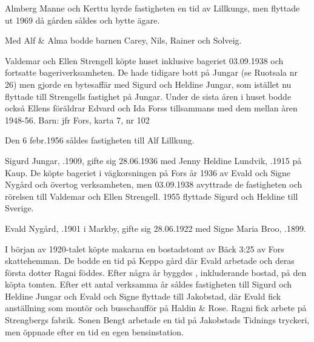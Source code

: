 Almberg Manne och Kerttu hyrde fastigheten en tid av Lillkungs, men flyttade ut 1969 då gården såldes och bytte ägare.

Med Alf \& Alma bodde barnen Carey, Nils, Rainer och Solveig.



Valdemar och Ellen Strengell köpte huset inklusive bageriet 03.09.1938 och fortsatte bageriverksamheten. De hade tidigare bott på Jungar (se Ruotsala nr 26) men gjorde en bytesaffär med Sigurd och Heldine Jungar, som istället nu flyttade till Strengells fastighet på Jungar. Under de sista åren i huset bodde också Ellens föräldrar Edvard och Ida Forss tillsammans med dem mellan åren 1948-56.
Barn: jfr Fors, karta 7, nr 102

Den 6 febr.1956 såldes fastigheten till Alf Lillkung.



Sigurd Jungar, .1909, gifte sig 28.06.1936 med Jenny Heldine Lundvik, .1915 på Kaup. De köpte bageriet i vägkorsningen på Fors år 1936 av Evald och Signe Nygård och övertog verksamheten, men 03.09.1938 avyttrade de fastigheten och rörelsen till Valdemar och Ellen Strengell. 1955 flyttade Sigurd och Heldine till Sverige.

\begin{jhchildren}
  \item {}
  \item {}
  \item {}
\end{jhchildren}



Evald Nygård, .1901 i Markby, gifte sig 28.06.1922 med Signe Maria Broo, .1899.

I början av 1920-talet köpte makarna en bostadstomt av Bäck 3:25 av Fors skattehemman. De bodde en tid på Keppo gård där Evald arbetade och deras första dotter Ragni föddes. Efter några år byggdes , inkluderande bostad, på den köpta tomten. Efter ett antal verksamma år såldes fastigheten till Sigurd och Heldine Jungar och Evald och Signe flyttade till Jakobstad, där Evald fick anställning som montör och busschaufför på Haldin \& Rose. Ragni fick arbete på Strengbergs fabrik. Sonen Bengt arbetade en tid på Jakobstads Tidnings tryckeri, men öppnade efter en tid en egen bensinstation.

